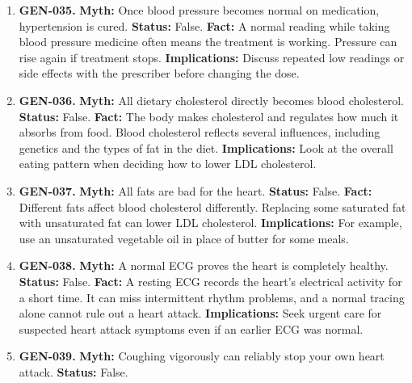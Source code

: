 \documentclass[11pt,oneside]{book}
\begin{document}
\begin{enumerate}[leftmargin=0pt,labelwidth=0pt,labelsep=0pt,itemindent=0pt]
\item[] \textbf{GEN-035.} \textbf{Myth:} Once blood pressure becomes normal on medication, hypertension is cured.\newline
\textbf{Status:} False.\newline
\textbf{Fact:} A normal reading while taking blood pressure medicine often means the treatment is working. Pressure can rise again if treatment stops. \cite{ref272}\newline
\textbf{Implications:} Discuss repeated low readings or side effects with the prescriber before changing the dose.
\item[] \textbf{GEN-036.} \textbf{Myth:} All dietary cholesterol directly becomes blood cholesterol.\newline
\textbf{Status:} False.\newline
\textbf{Fact:} The body makes cholesterol and regulates how much it absorbs from food. Blood cholesterol reflects several influences, including genetics and the types of fat in the diet. \cite{ref10}\newline
\textbf{Implications:} Look at the overall eating pattern when deciding how to lower LDL cholesterol.
\item[] \textbf{GEN-037.} \textbf{Myth:} All fats are bad for the heart.\newline
\textbf{Status:} False.\newline
\textbf{Fact:} Different fats affect blood cholesterol differently. Replacing some saturated fat with unsaturated fat can lower LDL cholesterol. \cite{ref10}\newline
\textbf{Implications:} For example, use an unsaturated vegetable oil in place of butter for some meals.
\item[] \textbf{GEN-038.} \textbf{Myth:} A normal ECG proves the heart is completely healthy.\newline
\textbf{Status:} False.\newline
\textbf{Fact:} A resting ECG records the heart's electrical activity for a short time. It can miss intermittent rhythm problems, and a normal tracing alone cannot rule out a heart attack. \cite{ref46}\newline
\textbf{Implications:} Seek urgent care for suspected heart attack symptoms even if an earlier ECG was normal.
\item[] \textbf{GEN-039.} \textbf{Myth:} Coughing vigorously can reliably stop your own heart attack.\newline
\textbf{Status:} False.\newline

\end{enumerate}
\end{document}
